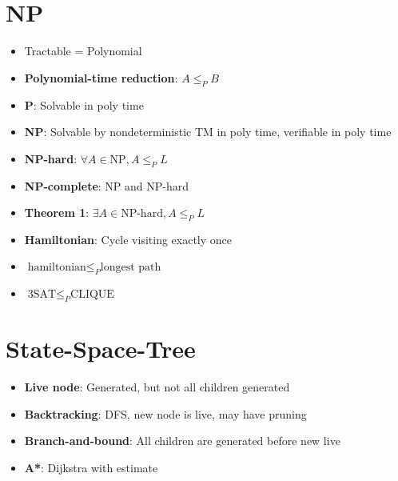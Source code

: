 \documentclass[11pt]{article}
\begin{document}
\section{NP}

\begin{itemize}
	\item Tractable = Polynomial
	\item \textbf{Polynomial-time reduction}: $A \le_P B$
	\item \textbf{P}: Solvable in poly time
	\item \textbf{NP}: Solvable by nondeterministic TM in poly time, verifiable in poly time
	\item \textbf{NP-hard}: $\forall{A \in \textrm{NP}}, A \le_P L$
	\item \textbf{NP-complete}: NP and NP-hard
	\item \textbf{Theorem 1}: $\exists{A \in \textrm{NP-hard}}, A \le_P L$
	\item \textbf{Hamiltonian}: Cycle visiting exactly once
	\item $\textrm{hamiltonian} \le_P \textrm{longest path}$
	\item $\textrm{3SAT} \le_P \textrm{CLIQUE}$
\end{itemize}

\section{State-Space-Tree}

\begin{itemize}
	\item \textbf{Live node}: Generated, but not all children generated
	\item \textbf{Backtracking}: DFS, new node is live, may have pruning
	\item \textbf{Branch-and-bound}: All children are generated before new live
	\item \textbf{A*}: Dijkstra with estimate
\end{itemize}
\end{document}
